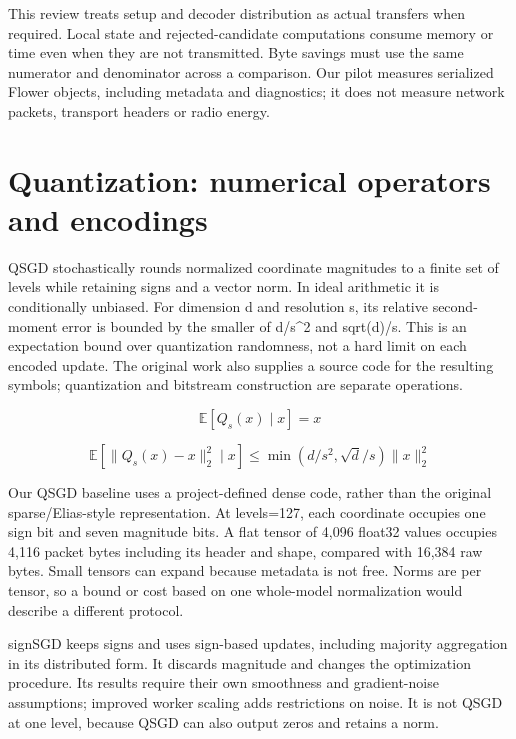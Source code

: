 This review treats setup and decoder distribution as actual transfers when required. Local state and rejected-candidate computations consume memory or time even when they are not transmitted. Byte savings must use the same numerator and denominator across a comparison. Our pilot measures serialized Flower objects, including metadata and diagnostics; it does not measure network packets, transport headers or radio energy.

\section{Quantization: numerical operators and encodings}

QSGD stochastically rounds normalized coordinate magnitudes to a finite set of levels while retaining signs and a vector norm. In ideal arithmetic it is conditionally unbiased. For dimension d and resolution s, its relative second-moment error is bounded by the smaller of d/s\textasciicircum{}2 and sqrt(d)/s. This is an expectation bound over quantization randomness, not a hard limit on each encoded update. The original work also supplies a source code for the resulting symbols; quantization and bitstream construction are separate operations. \parencite{alistarh2017qsgd}

\begin{equation*}\mathbb{E}[Q_s(x)\mid x] = x\end{equation*}

\begin{equation*}\mathbb{E}[\|Q_s(x)-x\|_2^2\mid x] \leq \min(d/s^2,\sqrt{d}/s)\|x\|_2^2\end{equation*}

Our QSGD baseline uses a project-defined dense code, rather than the original sparse/Elias-style representation. At levels=127, each coordinate occupies one sign bit and seven magnitude bits. A flat tensor of 4,096 float32 values occupies 4,116 packet bytes including its header and shape, compared with 16,384 raw bytes. Small tensors can expand because metadata is not free. Norms are per tensor, so a bound or cost based on one whole-model normalization would describe a different protocol.

signSGD keeps signs and uses sign-based updates, including majority aggregation in its distributed form. It discards magnitude and changes the optimization procedure. Its results require their own smoothness and gradient-noise assumptions; improved worker scaling adds restrictions on noise. It is not QSGD at one level, because QSGD can also output zeros and retains a norm. \parencite{bernstein2018signsgd}


